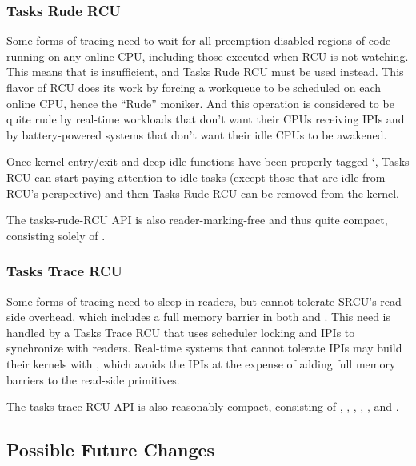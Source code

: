 \subsubsection{Tasks Rude RCU}

Some forms of tracing need to wait for all preemption-disabled regions
of code running on any online CPU, including those executed when RCU is
not watching.
This means that  is insufficient, and
Tasks Rude RCU must be used instead.
This flavor of RCU does its work by
forcing a workqueue to be scheduled on each online CPU, hence the ``Rude''
moniker.
And this operation is considered to be quite rude by real-time
workloads that don't want their  CPUs receiving IPIs and
by battery-powered systems that don't want their idle CPUs to be awakened.

Once kernel entry/exit and deep-idle functions have been properly tagged
`, Tasks RCU can start paying attention to idle tasks (except
those that are idle from RCU's perspective) and then Tasks Rude RCU can
be removed from the kernel.

The tasks-rude-RCU API is also reader-marking-free and thus quite compact,
consisting solely of .


\subsubsection{Tasks Trace RCU}

Some forms of tracing need to sleep in readers, but cannot tolerate
SRCU's read-side overhead, which includes a full memory barrier in both
 and .
This need is handled by a
Tasks Trace RCU that uses scheduler locking and IPIs to synchronize with
readers.
Real-time systems that cannot tolerate IPIs may build their
kernels with , which avoids the IPIs at
the expense of adding full memory barriers to the read-side primitives.

The tasks-trace-RCU API is also reasonably compact,
consisting of , ,
, ,
, and .


\subsection{Possible Future Changes}

